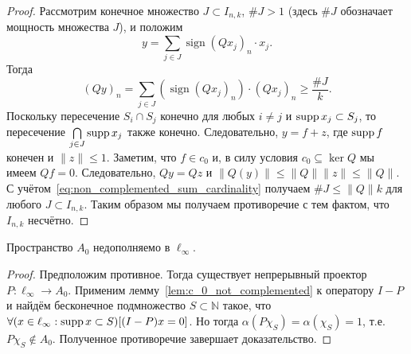 \begin{proof}
	Рассмотрим конечное множество $J \subset I_{n,k}$,
	$\#J>1$ (здесь $\#J$ обозначает мощность множества $J$),
	и положим
	\begin{equation}
		y = \sum_{j \in J} \operatorname{sign}{(Qx_j)_n} \cdot x_j
		.
	\end{equation}
	Тогда
	\begin{equation}
		\label{eq:non_complemented_sum_cardinality}
		(Qy)_n = \sum_{j \in J} 
		(\operatorname{sign}(Qx_j)_n)
		\cdot (Qx_j)_n \geq \frac{\# J}{k}
		.
	\end{equation}
	Поскольку пересечение $S_i \cap S_j$ конечно для любых $i \neq j$ и
	$\operatorname{supp} x_j \subset S_j$,
	то пересечение $\bigcap\limits_{j\in J} \operatorname{supp} x_j$ также конечно.
	Следовательно, $y = f + z$,
	где $\operatorname{supp} f$ конечен и $\|z\| \leq 1$.
	Заметим, что $f\in c_0$ и, в силу условия $c_0 \subseteq \ker Q$ мы имеем $Qf = 0$.
	Следовательно, $Qy = Qz$ и $\|Q(y)\| \leq \|Q\| \|z\| \leq \|Q\|$.
	С учётом~\eqref{eq:non_complemented_sum_cardinality} получаем $\# J \leq \|Q\| k$ для любого $J\subset I_{n,k}$.
	Таким образом мы получаем противоречие с тем фактом, что $I_{n,k}$ несчётно.
\end{proof}

\begin{theorem}
	Пространство $A_0$ недополняемо в $\ell_\infty$.
\end{theorem}

\begin{proof}
	Предположим противное.
	Тогда существует непрерывный проектор $P: \ell_\infty \to A_0$.
	Применим лемму~\ref{lem:c_0_not_complemented} к оператору $I-P$ и найдём бесконечное подмножество $S\subset\mathbb{N}$ такое,
	что $\forall(x\in\ell_\infty : \operatorname{supp} x \subset S)[(I-P)x = 0]$.
	Но тогда $\alpha(P\chi_S) = \alpha(\chi_S) = 1$, т.е. $P\chi_S \notin A_0$.
	Полученное противоречие завершает доказательство.
\end{proof}

